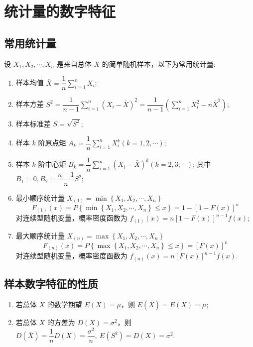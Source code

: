\section{统计量的数字特征}

\subsection{常用统计量}

\begin{definition}[常用统计量]
    设 $ X_{1}, X_{2}, \cdots, X_{n} $ 是来自总体 $ X $ 的简单随机样本，以下为常用统计量:
    \begin{enumerate}[label=(\arabic{*})]
        \item 样本均值 $ \bar{X}=\dfrac{1}{n} \displaystyle\sum_{i=1}^{n} X_{i} $;
        \item 样本方差 $S^{2}=\dfrac{1}{n-1} \displaystyle\sum_{i=1}^{n}\left(X_{i}-\bar{X}\right)^{2}=\dfrac{1}{n-1}\left(\displaystyle\sum_{i=1}^{n} X_{i}^{2}-n \bar{X}^{2}\right) $;
        \item 样本标准差 $ S=\sqrt{S^{2}} $;
        \item 样本 $ k $ 阶原点矩 $A_{k}=\dfrac{1}{n} \displaystyle\sum_{i=1}^{n} X_{i}^{k}(k=1,2, \cdots) $;
        \item 样本 $ k $ 阶中心矩 $B_{k}=\dfrac{1}{n} \displaystyle\sum_{i=1}^{n}\left(X_{i}-\bar{X}\right)^{k}(k=2,3, \cdots) $;
        其中 $ B_{1}=0, B_{2}=\dfrac{n-1}{n} S^{2} $;
        \item 最小顺序统计量 $X_{(1)}=\min \left\{X_{1}, X_{2}, \cdots, X_{n}\right\}$
        $$F_{(1)}(x)=P\left\{\min \left\{X_{1}, X_{2}, \cdots, X_{n}\right\} \leqslant x\right\}=1-[1-F(x)]^{n}$$
        对连续型随机变量，概率密度函数为 $f_{(1)}(x)=n[1-F(x)]^{n-1} f(x) $;
        \item 最大顺序统计量 $X_{(n)}=\max \left\{X_{1}, X_{2}, \cdots, X_{n}\right\}$
        $$F_{(n)}(x)=P\left\{\max \left\{X_{1}, X_{2}, \cdots, X_{n}\right\} \leqslant x\right\}=[F(x)]^{n}$$
        对连续型随机变量，概率密度函数为 $f_{(n)}(x)=n[F(x)]^{n-1} f(x) .$
    \end{enumerate}
\end{definition}

\subsection{样本数字特征的性质}

\begin{theorem}[样本数字特征的性质]
    \begin{enumerate}[label=(\arabic{*})]
        \item 若总体 $ X $ 的数学期望 $ E(X)=\mu$，则 $E(\bar{X})=E(X)=\mu ;$
        \item 若总体 $ X $ 的方差为 $ D(X)=\sigma^{2} $，则 $D(\bar{X})=\dfrac{1}{n} D(X)=\dfrac{\sigma^{2}}{n},~E\left(S^{2}\right)=D(X)=\sigma^{2} .$
    \end{enumerate}
\end{theorem}

